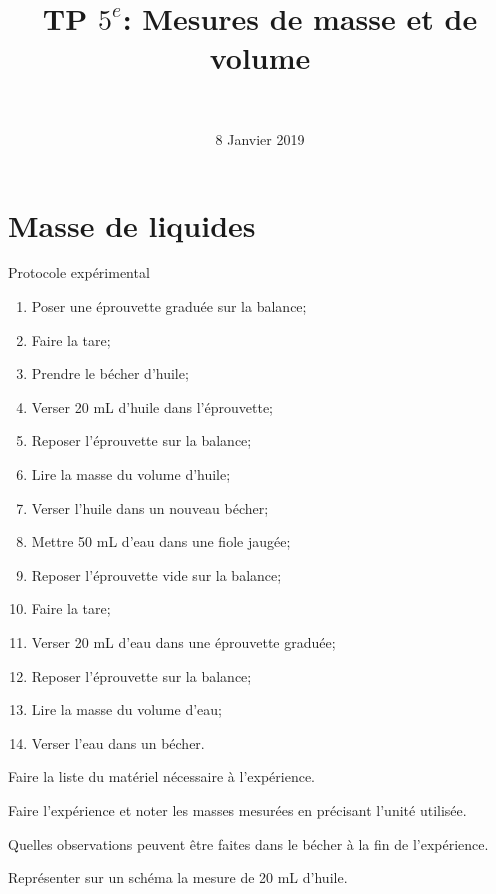 \documentclass[a4paper,11pt]{exam}
\author{\ }
\date{8 Janvier 2019}
\title{TP $5^e$: Mesures de masse et de volume}
\begin{document}
	\maketitle

\section{Masse de liquides}\label{part:liquide}

\begin{doc}
	\caption{Protocole expérimental}
	\label{doc:proto1}
	\begin{multicols}{2}
			
		\begin{enumerate}[label=\arabic*)]
			
			\item Poser une éprouvette graduée sur la balance;
			\item Faire la tare;
			\item Prendre le bécher d'huile;
			\item Verser 20 mL d'huile dans l'éprouvette;
			\item Reposer l'éprouvette sur la balance;
			\item Lire la masse du volume d'huile;
			\item Verser l'huile dans un nouveau bécher;
			\item Mettre 50 mL d'eau dans une fiole jaugée;
			\item Reposer l'éprouvette vide sur la balance;
			\item Faire la tare;
			\item Verser 20 mL d'eau dans une éprouvette graduée;
			\item Reposer l'éprouvette sur la balance;
			\item Lire la masse du volume d'eau;
			\item Verser l'eau dans un bécher.
			
			
		\end{enumerate}
	\end{multicols}
\end{doc}	


\begin{questions}
	
	
	\question Faire la liste du matériel nécessaire à l'expérience.
	
	\fillwithdottedlines{3cm}
	
	\question Faire l'expérience et noter les masses mesurées en précisant l'unité utilisée.
	
	\fillwithdottedlines{1cm}	
	
	\question Quelles observations peuvent être faites dans le bécher à la fin de l'expérience.
	\fillwithdottedlines{1.5cm}
	
	\question Représenter sur un schéma la mesure de 20 mL d'huile.
	
	\makeemptybox{5.5cm}
\end{questions}
\end{document}

